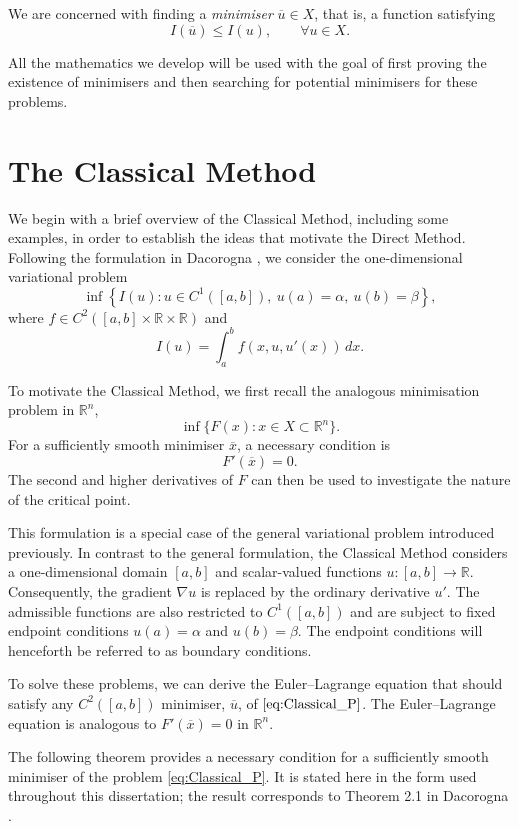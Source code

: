 We are concerned with finding a \textit{minimiser} $\overline{u} \in X$, 
that is, a function satisfying
\[
    I(\overline{u}) \leq I(u), \qquad \forall u \in X.
\]

All the mathematics we develop will be used with the goal of first proving the existence of minimisers and then searching for potential minimisers for these problems. 

\section{The Classical Method}

We begin with a brief overview of the Classical Method, including some examples, in order to establish the ideas that motivate the Direct Method. Following the formulation in Dacorogna \cite[p.~57]{dacorogna}, we consider the one-dimensional variational problem
\begin{equation}
\inf \left\{
I(u): u \in C^1([a,b]),\ u(a)=\alpha,\ u(b)=\beta
\right\},
\tag{B}
\label{eq:Classical_P}
\end{equation}
where $f \in C^2([a,b]\times\mathbb{R}\times\mathbb{R})$ and
\[
    I(u)=\int_a^b f(x,u,u'(x))\,dx.
\]

To motivate the Classical Method, we first recall the analogous minimisation problem in $\mathbb{R}^n$,
\[
\inf\{F(x):x\in X\subset\mathbb{R}^n\}.
\]
For a sufficiently smooth minimiser $\overline{x}$, a necessary condition is
\[
F'(\overline{x})=0.
\]
The second and higher derivatives of $F$ can then be used to investigate the nature of the critical point.

This formulation is a special case of the general variational problem introduced previously. In contrast to the general formulation, the Classical Method considers a one-dimensional domain $[a,b]$ and scalar-valued functions $u:[a,b]\rightarrow\mathbb{R}$. Consequently, the gradient $\nabla u$ is replaced by the ordinary derivative $u'$. The admissible functions are also restricted to $C^1([a,b])$ and are subject to fixed endpoint conditions $u(a)=\alpha$ and $u(b)=\beta$. The endpoint conditions will henceforth be referred to as boundary conditions.

To solve these problems, we can derive the Euler–Lagrange equation that should satisfy any $C^2([a,b])$ minimiser, $\overline{u}$, of $\eqref{eq:Classical_P}$. The Euler–Lagrange equation is analogous to $F'(\overline{x}) = 0$ in $\mathbb{R}^n$. \cite{dacorogna}

The following theorem provides a necessary condition for a sufficiently smooth minimiser of the problem \eqref{eq:Classical_P}. It is stated here in the form used throughout this dissertation; the result corresponds to Theorem 2.1 in Dacorogna \cite[Theorem 2.1, p.~59]{dacorogna}.

